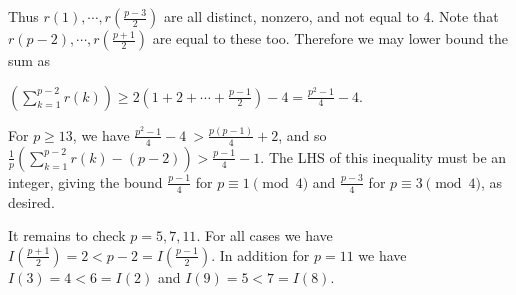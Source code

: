 \documentclass[11pt,a4paper]{article}
\begin{document}
\begin{enumerate}
        Thus $r(1), \cdots, r(\frac{p-3}{2})$ are all distinct, nonzero, and not equal to 4. Note that $r(p-2), \cdots, r(\frac{p+1}{2})$ are equal to these too. Therefore we may lower bound the sum as
        
        $\left(\sum_{k=1}^{p-2} r(k)\right)\ge 2(1 + 2 + \cdots + \frac{p-1}{2}) - 4 = \frac{p^2-1}{4}-4$.
        
        For $p\ge 13$, we have $\frac{p^2-1}{4}-4\ > \frac{p(p-1)}{4}+2$, and so $\frac {1}{p}\left(\sum_{k=1}^{p-2} r(k) -(p-2)\right) > \frac{p-1}{4} - 1$. The LHS of this inequality must be an integer, giving the bound $\frac{p-1}{4}$ for $p\equiv 1\pmod{4}$ and $\frac{p-3}{4}$ for $p\equiv 3\pmod{4}$, as desired.
        
        It remains to check $p=5, 7, 11$. For all cases we have $I(\frac{p+1}{2})=2 < p-2=I(\frac{p-1}{2})$. In addition for $p=11$ we have $I(3)=4<6=I(2)$ and $I(9)=5<7=I(8)$.
    \end{enumerate}
\end{document}
